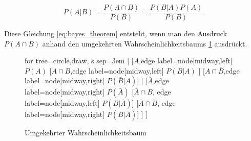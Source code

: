\begin{equation}
\label{eq:bayes_theorem}
	P(A|B) = \frac{P(A \cap B)}{P(B)} = \frac{P(B|A)P(A)}{P(B)}
\end{equation}

Diese Gleichung \ref{eq:bayes_theorem} entsteht, wenn man den Ausdruck $P(A \cap B)$ anhand den umgekehrten Wahrscheinlichkeitsbaums \ref{fig:inv_probability_tree} ausdrückt. 


\begin{figure}[H]
	\centering
	\label{fig:inv_probability_tree}
	\begin{forest}
	for tree={circle,draw, s sep=3em}
	[ 
	    [$A$,edge label={node[midway,left] {$P(A)$}}
	      [$A \cap B$,edge label={node[midway,left] {$P(B|A)$}} ] 
	      [$A \cap \bar{B}$,edge label={node[midway,right] {$P(\bar{B}|A)$}}] 
	    ]
	    [$\bar{A}$,edge label={node[midway,right] {$P(\bar{A})$}}
	      [$\bar{A} \cap B$, edge label={node[midway,left] {$P(B|\bar{A})$}}] 
	      [$\bar{A} \cap \bar{B}$, edge label={node[midway,right] {$P(\bar{B}| \bar{A})$}}] 
	  ] 
	]
	\end{forest}
	\caption{Umgekehrter Wahrscheinlichkeitsbaum}
\end{figure}

